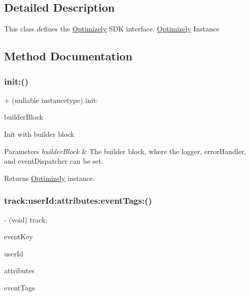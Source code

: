 \subsection{Detailed Description}
This class defines the \mbox{\hyperlink{interface_optimizely}{Optimizely}} S\+DK interface. \mbox{\hyperlink{interface_optimizely}{Optimizely}} Instance 

\subsection{Method Documentation}
\mbox{\label{interface_optimizely_a6fdb3abc6df8054f6780cf27c16b6e51}} 
\subsubsection{\texorpdfstring{init\+:()}{init:()}}
{\footnotesize\ttfamily + (nullable instancetype) init\+: \begin{DoxyParamCaption}\item[{(nonnull O\+P\+T\+L\+Y\+Builder\+Block)}]{builder\+Block }\end{DoxyParamCaption}}

Init with builder block 
\begin{DoxyParams}{Parameters}
{\em builder\+Block} & The builder block, where the logger, error\+Handler, and event\+Dispatcher can be set. \\
\hline
\end{DoxyParams}
\begin{DoxyReturn}{Returns}
\mbox{\hyperlink{interface_optimizely}{Optimizely}} instance. 
\end{DoxyReturn}
\mbox{\label{interface_optimizely_ac8630f5b706a02b20e7ba66e15addc42}} 
\subsubsection{\texorpdfstring{track\+:user\+Id\+:attributes\+:event\+Tags\+:()}{track:userId:attributes:eventTags:()}}
{\footnotesize\ttfamily -\/ (void) track\+: \begin{DoxyParamCaption}\item[{(nonnull N\+S\+String $\ast$)}]{event\+Key }\item[{userId:(nonnull N\+S\+String $\ast$)}]{user\+Id }\item[{attributes:(nullable N\+S\+Dictionary$<$ N\+S\+String $\ast$, N\+S\+String $\ast$ $>$ $\ast$)}]{attributes }\item[{eventTags:(nullable N\+S\+Dictionary$<$ N\+S\+String $\ast$, id $>$ $\ast$)}]{event\+Tags }\end{DoxyParamCaption}}

